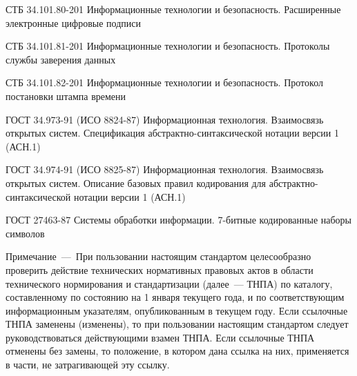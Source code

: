 СТБ 34.101.80-201 
Информационные технологии и безопасность. 
Расширенные электронные цифровые подписи

СТБ 34.101.81-201 
Информационные технологии и безопасность. 
Протоколы службы заверения данных

СТБ 34.101.82-201 
Информационные технологии и безопасность. 
Протокол постановки штампа времени

ГОСТ 34.973-91 (ИСО 8824-87) Информационная технология. Взаимосвязь 
открытых систем. Спецификация абстрактно-синтаксической нотации версии 1 
(АСН.1) 

ГОСТ 34.974-91 (ИСО 8825-87) Информационная технология. Взаимосвязь 
открытых систем. Описание базовых правил кодирования для 
абстрактно-синтаксической нотации версии 1 (АСН.1) 

ГОСТ 27463-87 Системы обработки информации. 
7-битные кодированные наборы символов

\begin{note}
Примечание~---~При пользовании настоящим стандартом
целесообразно проверить действие технических нормативных правовых
актов в области технического нормирования и стандартизации (далее~--- ТНПА) 
по каталогу, составленному по состоянию на 1 января текущего
года, и по соответствующим информационным указателям, опубликованным
в текущем году. Если ссылочные ТНПА заменены (изменены), то при
пользовании настоящим стандартом следует руководствоваться
действующими взамен ТНПА. Если ссылочные ТНПА отменены без
замены, то положение, в котором дана ссылка на них, применяется в
части, не затрагивающей эту ссылку.
\end{note}
